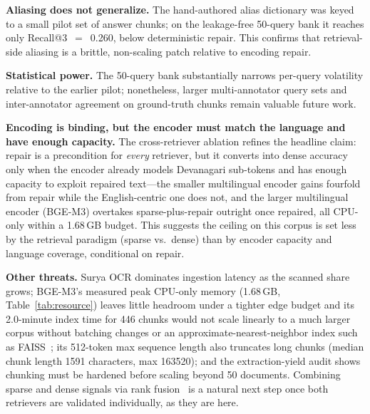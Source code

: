 \documentclass[journal]{IEEEtran}
\newcommand{\corpusDocs}{50}
\newcommand{\corpusChunks}{446}
\newcommand{\nqueries}{50}
\newcommand{\chunkLenMedian}{1591}
\newcommand{\chunkLenMax}{163520}
\newcommand{\aliRecall}{0.260}
\newcommand{\densePeakRSS}{1.68}
\newcommand{\bgeIndexTime}{2.0}
\begin{document}
\textbf{Aliasing does not generalize.} The hand-authored alias dictionary was keyed to a small pilot set of answer chunks; on the leakage-free \nqueries{}-query bank it reaches only Recall@3~$=$~\aliRecall{}, below deterministic repair. This confirms that retrieval-side aliasing is a brittle, non-scaling patch relative to encoding repair.

\textbf{Statistical power.} The \nqueries{}-query bank substantially narrows per-query volatility relative to the earlier pilot; nonetheless, larger multi-annotator query sets and inter-annotator agreement on ground-truth chunks remain valuable future work.

\textbf{Encoding is binding, but the encoder must match the language and have enough capacity.} The cross-retriever ablation refines the headline claim: repair is a precondition for \emph{every} retriever, but it converts into dense accuracy only when the encoder already models Devanagari sub-tokens and has enough capacity to exploit repaired text---the smaller multilingual encoder gains fourfold from repair while the English-centric one does not, and the larger multilingual encoder (BGE-M3) overtakes sparse-plus-repair outright once repaired, all CPU-only within a \densePeakRSS{}\,GB budget. This suggests the ceiling on this corpus is set less by the retrieval paradigm (sparse vs.\ dense) than by encoder capacity and language coverage, conditional on repair.

\textbf{Other threats.} Surya OCR dominates ingestion latency as the scanned share grows; BGE-M3's measured peak CPU-only memory (\densePeakRSS{}\,GB, Table~\ref{tab:resource}) leaves little headroom under a tighter edge budget and its \bgeIndexTime{}-minute index time for \corpusChunks{} chunks would not scale linearly to a much larger corpus without batching changes or an approximate-nearest-neighbor index such as FAISS~\cite{johnson2019faiss}; its 512-token max sequence length also truncates long chunks (median chunk length \chunkLenMedian{} characters, max \chunkLenMax{}); and the extraction-yield audit shows chunking must be hardened before scaling beyond \corpusDocs{} documents. Combining sparse and dense signals via rank fusion~\cite{cormack2009rrf} is a natural next step once both retrievers are validated individually, as they are here.

\end{document}
